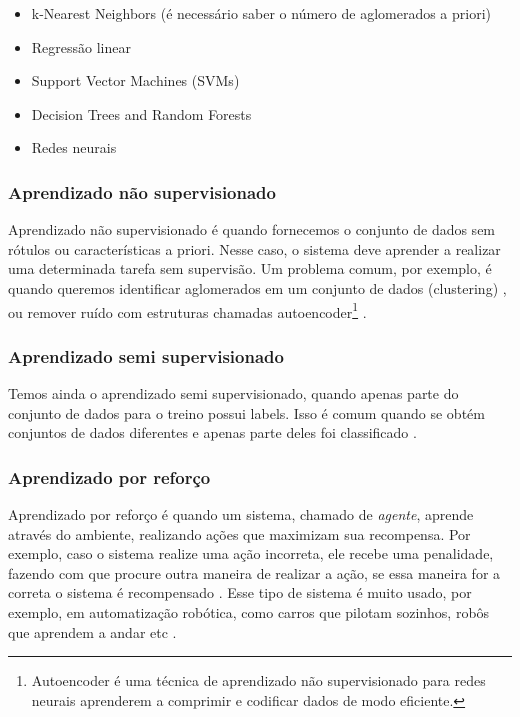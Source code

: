 \documentclass[a4paper,12pt,oneside]{book}
\begin{document}
\begin{itemize}
    \item k-Nearest Neighbors (é necessário saber o número de aglomerados a priori) \cite{knn}
    \item Regressão linear
    \item Support Vector Machines (SVMs)
    \item Decision Trees and Random Forests
    \item Redes neurais
\end{itemize}

\subsubsection*{Aprendizado não supervisionado}

\par Aprendizado não supervisionado é quando fornecemos o conjunto de dados sem rótulos ou características a priori. Nesse caso, o sistema deve aprender a realizar uma determinada tarefa sem supervisão. Um problema comum, por exemplo, é quando queremos identificar aglomerados em um conjunto de dados (clustering) \cite{unsupervised, knn_uns}, ou remover ruído com estruturas chamadas autoencoder\footnote[1]{Autoencoder é uma técnica de aprendizado não supervisionado para redes neurais aprenderem a comprimir e codificar dados de modo eficiente.} \cite{8621080}.

\subsubsection*{Aprendizado semi supervisionado}

\par Temos ainda o aprendizado semi supervisionado, quando apenas parte do conjunto de dados para o treino possui labels. Isso é comum quando se obtém conjuntos de dados diferentes e apenas parte deles foi classificado \cite{semi_supervised}.

\subsubsection*{Aprendizado por reforço}

\par Aprendizado por reforço é quando um sistema, chamado de \textit{agente}, aprende através do ambiente, realizando ações que maximizam sua recompensa. Por exemplo, caso o sistema realize uma ação incorreta, ele recebe uma penalidade, fazendo com que procure outra maneira de realizar a ação, se essa maneira for a correta o sistema é recompensado \cite{reinforcement}. Esse tipo de sistema é muito usado, por exemplo, em automatização robótica, como carros que pilotam sozinhos, robôs que aprendem a andar etc \cite{robot_ml}.
\end{document}
